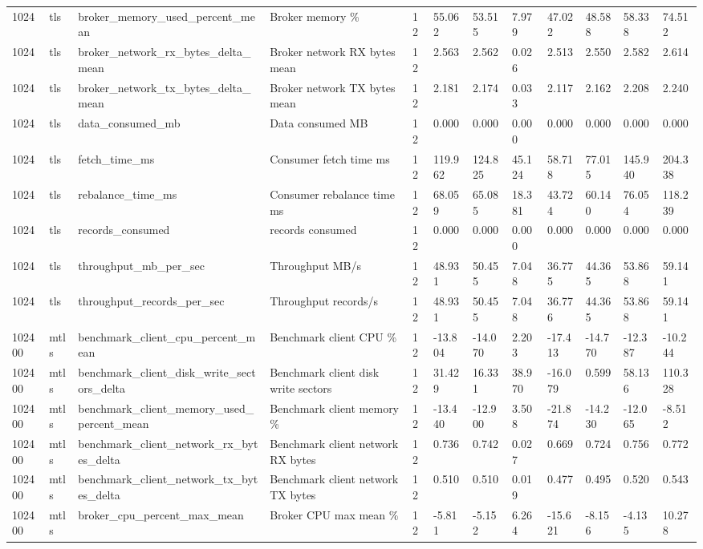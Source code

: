 \begin{longtable}{llllllllllll}
1024 & tls & broker\_memory\_used\_percent\_mean & Broker memory \% & 12 & 55.062 & 53.515 & 7.979 & 47.022 & 48.588 & 58.338 & 74.512 \\
1024 & tls & broker\_network\_rx\_bytes\_delta\_mean & Broker network RX bytes mean & 12 & 2.563 & 2.562 & 0.026 & 2.513 & 2.550 & 2.582 & 2.614 \\
1024 & tls & broker\_network\_tx\_bytes\_delta\_mean & Broker network TX bytes mean & 12 & 2.181 & 2.174 & 0.033 & 2.117 & 2.162 & 2.208 & 2.240 \\
1024 & tls & data\_consumed\_mb & Data consumed MB & 12 & 0.000 & 0.000 & 0.000 & 0.000 & 0.000 & 0.000 & 0.000 \\
1024 & tls & fetch\_time\_ms & Consumer fetch time ms & 12 & 119.962 & 124.825 & 45.124 & 58.718 & 77.015 & 145.940 & 204.338 \\
1024 & tls & rebalance\_time\_ms & Consumer rebalance time ms & 12 & 68.059 & 65.085 & 18.381 & 43.724 & 60.140 & 76.054 & 118.239 \\
1024 & tls & records\_consumed & records consumed & 12 & 0.000 & 0.000 & 0.000 & 0.000 & 0.000 & 0.000 & 0.000 \\
1024 & tls & throughput\_mb\_per\_sec & Throughput MB/s & 12 & 48.931 & 50.455 & 7.048 & 36.775 & 44.365 & 53.868 & 59.141 \\
1024 & tls & throughput\_records\_per\_sec & Throughput records/s & 12 & 48.931 & 50.455 & 7.048 & 36.776 & 44.365 & 53.868 & 59.141 \\
102400 & mtls & benchmark\_client\_cpu\_percent\_mean & Benchmark client CPU \% & 12 & -13.804 & -14.070 & 2.203 & -17.413 & -14.770 & -12.387 & -10.244 \\
102400 & mtls & benchmark\_client\_disk\_write\_sectors\_delta & Benchmark client disk write sectors & 12 & 31.429 & 16.331 & 38.970 & -16.079 & 0.599 & 58.136 & 110.328 \\
102400 & mtls & benchmark\_client\_memory\_used\_percent\_mean & Benchmark client memory \% & 12 & -13.440 & -12.900 & 3.508 & -21.874 & -14.230 & -12.065 & -8.512 \\
102400 & mtls & benchmark\_client\_network\_rx\_bytes\_delta & Benchmark client network RX bytes & 12 & 0.736 & 0.742 & 0.027 & 0.669 & 0.724 & 0.756 & 0.772 \\
102400 & mtls & benchmark\_client\_network\_tx\_bytes\_delta & Benchmark client network TX bytes & 12 & 0.510 & 0.510 & 0.019 & 0.477 & 0.495 & 0.520 & 0.543 \\
102400 & mtls & broker\_cpu\_percent\_max\_mean & Broker CPU max mean \% & 12 & -5.811 & -5.152 & 6.264 & -15.621 & -8.156 & -4.135 & 10.278 \\

\end{longtable}
